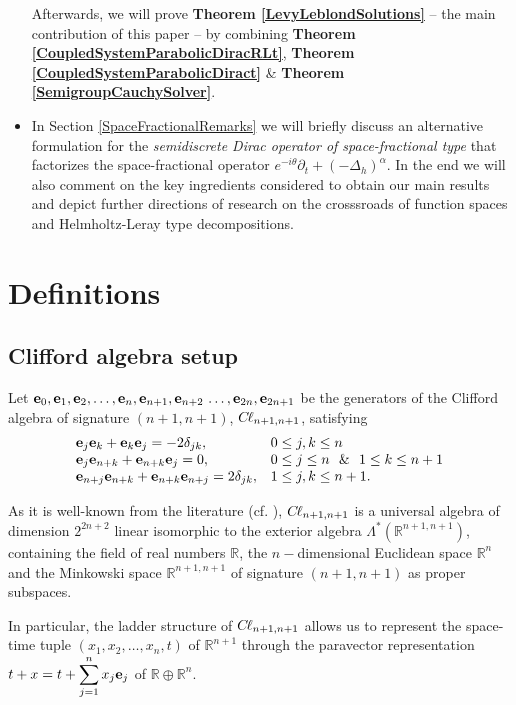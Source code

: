 \documentclass{elsarticle}
\newcommand{\BR}{{\mathbb R}}
\newcommand{\e}{{\bf e}}
\newcommand{\cl}{C \kern -0.1em \ell}
\begin{document}
\begin{itemize}
	Afterwards, we will prove {\bf Theorem \ref{LevyLeblondSolutions}} -- the main contribution of this paper -- by combining {\bf Theorem \ref{CoupledSystemParabolicDiracRLt}}, {\bf Theorem \ref{CoupledSystemParabolicDiract}} \& {\bf Theorem \ref{SemigroupCauchySolver}}. 
	\item In Section \ref{SpaceFractionalRemarks} we will briefly discuss an alternative formulation for the {\it semidiscrete Dirac operator of space-fractional type} that factorizes the space-fractional operator $e^{-i\theta}\partial_t+(-\Delta_h)^\alpha$. In the end we will also comment on the key ingredients considered to obtain our main results and depict further directions of research on the crosssroads of function spaces and Helmholtz-Leray type decompositions.
\end{itemize}



\section{Definitions}\label{DefsSection}

\subsection{Clifford algebra setup}

Let $\e_0,\e_1,\e_2,\ldots,\e_n,\e_{n+1},\e_{n+2}\,\ldots,\e_{2n},\e_{2n+1}$ be the generators of the Clifford algebra of signature $(n+1,n+1)$, $\cl_{n+1,n+1}$, satisfying 
\begin{eqnarray}
	\label{CliffordBasis}
	\begin{array}{lll}
		\e_j \e_k+ \e_k \e_j=-2\delta_{jk}, & 0\leq j,k\leq n \\
		\e_{j} \e_{n+k}+ \e_{n+k} \e_{j}=0, & 0\leq j\leq n ~~\&~~  1\leq k\leq n+1\\
		\e_{n+j} \e_{n+k}+ \e_{n+k} \e_{n+j}=2\delta_{jk}, & 1\leq j,k\leq
		n+1.
	\end{array}
\end{eqnarray}

As it is well-known from the literature (cf.
\cite[Chapter 3]{VR16}), $\cl_{n+1,n+1}$ is a
universal algebra of dimension $2^{2n+2}$ linear isomorphic to the
exterior algebra $\Lambda^*\left(\BR^{n+1,n+1}\right)$,   containing the field of real numbers $\BR$, the $n-$dimensional Euclidean space $\BR^n$ and the Minkowski space $\BR^{n+1,n+1}$ of signature $(n+1,n+1)$ as proper subspaces. 

In particular, the ladder structure of $\cl_{n+1,n+1}$ allows us to represent the space-time tuple $(x_1,x_2,\ldots,x_n,t)$ of $\BR^{n+1}$ through the paravector representation $\displaystyle t+x=t+\sum_{j=1}^{n}x_j\e_j$ of  $\BR\oplus \BR^n$. 
\end{document}
